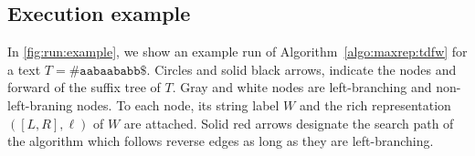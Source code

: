 \subsection{Execution example}

In \cref{fig:run:example}, we show an example run of Algorithm~\ref{algo:maxrep:tdfw} for a text $T = \mathtt{\#aabaababb\$}$. Circles and solid black arrows, indicate the nodes and forward of the suffix tree of $T$.
    Gray and white nodes are left-branching and non-left-braning nodes. To each node, its string label $W$ and the rich representation $([L, R], \ell)$ of $W$ are attached. Solid red arrows designate the search path of the algorithm which follows reverse edges as long as they are left-branching.








